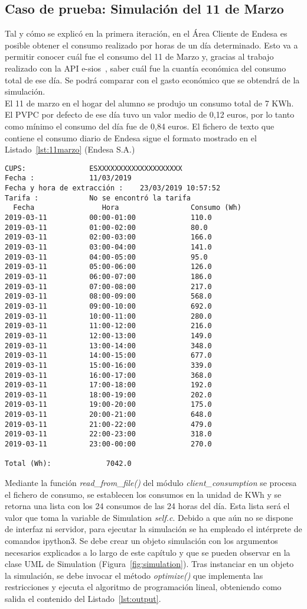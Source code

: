 \subsection{Caso de prueba: Simulación del 11 de Marzo}
Tal y cómo se explicó en la primera iteración, en el Área Cliente de Endesa es posible obtener el consumo realizado por horas de un día determinado. Esto va a permitir conocer cuál fue el consumo del 11 de Marzo y, gracias al trabajo realizado con la \gls{API} e-sios~\cite{Ree}, saber cuál fue la cuantía económica del consumo total de ese día. Se podrá comparar con el gasto económico que se obtendrá de la simulación.\\

El 11 de marzo en el hogar del alumno se produjo un consumo total de 7 KWh. El \gls{PVPC} por defecto de ese día tuvo un valor medio de 0,12 euros, por lo tanto como mínimo el consumo del día fue de 0,84 euros. El fichero de texto que contiene el consumo diario de Endesa sigue el formato mostrado en el Listado~\ref{lst:11marzo} (\textcopyright Endesa S.A.)\\

\begin{lstlisting}[float=ht,numbers=none,caption={Fichero de consumo por horas de Endesa},label={lst:11marzo}]
CUPS:				ESXXXXXXXXXXXXXXXXXXXX
Fecha :				11/03/2019
Fecha y hora de extracción :	23/03/2019 10:57:52
Tarifa :			No se encontró la tarifa
  Fecha 			   Hora 			    Consumo (Wh)
2019-03-11			00:00-01:00				110.0
2019-03-11			01:00-02:00				80.0
2019-03-11			02:00-03:00				166.0
2019-03-11			03:00-04:00				141.0
2019-03-11			04:00-05:00				95.0
2019-03-11			05:00-06:00				126.0
2019-03-11			06:00-07:00				186.0
2019-03-11			07:00-08:00				217.0
2019-03-11			08:00-09:00				568.0
2019-03-11			09:00-10:00				692.0
2019-03-11			10:00-11:00				280.0
2019-03-11			11:00-12:00				216.0
2019-03-11			12:00-13:00				149.0
2019-03-11			13:00-14:00				348.0
2019-03-11			14:00-15:00				677.0
2019-03-11			15:00-16:00				339.0
2019-03-11			16:00-17:00				368.0
2019-03-11			17:00-18:00				192.0
2019-03-11			18:00-19:00				202.0
2019-03-11			19:00-20:00				175.0
2019-03-11			20:00-21:00				648.0
2019-03-11			21:00-22:00				479.0
2019-03-11			22:00-23:00				318.0
2019-03-11			23:00-00:00				270.0

Total (Wh):				7042.0
\end{lstlisting}
Mediante la función \textit{read\_from\_file()} del módulo \textit{client\_consumption} se procesa el fichero de consumo, se establecen los consumos en la unidad de KWh y se retorna una lista con los 24 consumos de las 24 horas del día. Esta lista será el valor que toma la variable de Simulation \textit{self.c}. Debido a que aún no se dispone de interfaz ni servidor, para ejecutar la simulación se ha empleado el intérprete de comandos ipython3. Se debe crear un objeto simulación con los argumentos necesarios explicados a lo largo de este capítulo y que se pueden observar en la clase UML de Simulation (Figura~\ref{fig:simulation}). Tras instanciar en un objeto la simulación, se debe invocar el método \textit{optimize()} que implementa las restricciones y ejecuta el algoritmo de programación lineal, obteniendo como salida el contenido del Listado~\ref{lst:output}.\\


